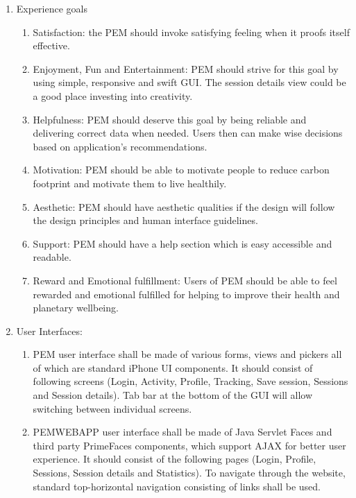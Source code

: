 \documentclass[12pt, a4paper]{report}   %
\begin{document}
\begin{enumerate}
\begin{enumerate}
\begin{enumerate}
		\item Experience goals
		\begin{enumerate}
			\item Satisfaction: the PEM should invoke satisfying feeling when it proofs itself effective.
			\item Enjoyment, Fun and Entertainment: PEM should strive for this goal by using simple, responsive and swift GUI. The session details view could be a good place investing into creativity.
			\item Helpfulness: PEM should deserve this goal by being reliable and delivering correct data when needed. Users then can make wise decisions based on application's recommendations.
			\item Motivation: PEM should be able to motivate people to reduce carbon footprint and motivate them to live healthily.
			\item Aesthetic: PEM should have aesthetic qualities if the design will follow the design principles and human interface guidelines.
			\item Support: PEM should have a help section which is easy accessible and readable.
			\item Reward and Emotional fulfillment: Users of PEM should be able to feel rewarded and emotional fulfilled for helping to improve their health and planetary wellbeing.\\
		\end{enumerate}
		
		\item User Interfaces:
		\begin{enumerate}
			\item PEM user interface shall be made of various forms, views and pickers all of which are standard iPhone UI components. It should consist of following screens (Login, Activity, Profile, Tracking, Save session, Sessions and Session details). Tab bar at the bottom of the GUI will allow switching between individual screens.\\
			\item PEMWEBAPP user interface shall be made of Java Servlet Faces and third party PrimeFaces components, which support AJAX for better user experience. It should consist of the following pages (Login, Profile, Sessions, Session details and Statistics). To navigate through the website, standard top-horizontal navigation consisting of links shall be used.\\
			\end{enumerate}
	

\end{enumerate}
\end{enumerate}
\end{enumerate}
\end{document}
